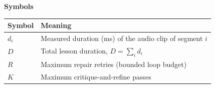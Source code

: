 \vspace{6mm}
\noindent\textbf{Symbols}
\begin{center}
\begin{tabular}{@{}ll@{}}
\toprule
\textbf{Symbol} & \textbf{Meaning}\\
\midrule
$d_i$ & Measured duration (ms) of the audio clip of segment $i$\\
$D$   & Total lesson duration, $D=\sum_i d_i$\\
$R$   & Maximum repair retries (bounded loop budget)\\
$K$   & Maximum critique-and-refine passes\\
\bottomrule
\end{tabular}
\end{center}
